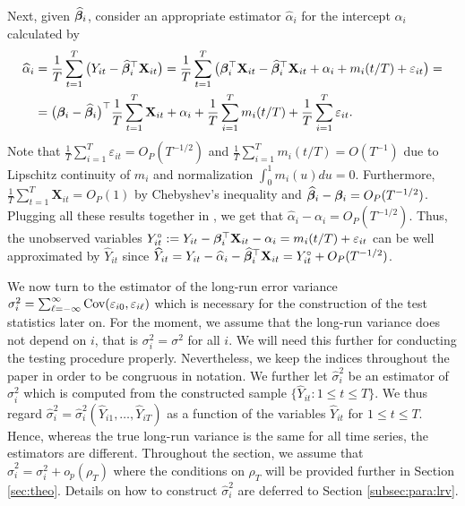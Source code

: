 \documentclass[a4paper,12pt]{article}
\makeatletter
\renewcommand{\eqref}[1]{\tagform@{\ref{#1}}}
\makeatother
\begin{document}
Next, given $\widehat{\bm{\beta}}_i$, consider an appropriate estimator $\widehat{\alpha}_{i}$ for the intercept $\alpha_i$ calculated by
\begin{align}\label{alpha-est}
\widehat{\alpha}_i &= \frac{1}{T}\sum_{t=1}^T \big(Y_{it} - \widehat{\bm{\beta}}_i^\top \mathbf{X}_{it}\big) = \frac{1}{T}\sum_{t=1}^T \big(\bm{\beta}_i^\top \mathbf{X}_{it} - \widehat{\bm{\beta}}_i^\top \mathbf{X}_{it} + \alpha_i + m_i(t/T) + \varepsilon_{it}\big) =\\
&= \big(\bm{\beta}_i - \widehat{\bm{\beta}}_i \big)^\top\frac{1}{T}\sum_{t=1}^T  \mathbf{X}_{it} + \alpha_i + \frac{1}{T}\sum_{i=1}^T m_i(t/T) + \frac{1}{T}\sum_{i=1}^T \varepsilon_{it}.\nonumber
\end{align}
Note that $\frac{1}{T}\sum_{i=1}^T \varepsilon_{it} = O_P(T^{-1/2})$ and $\frac{1}{T}\sum_{i=1}^T m_i(t/T) = O(T^{-1})$ due to Lipschitz continuity of $m_i$ and normalization $\int_{0}^1 m_i(u)du = 0$. Furthermore, $\frac{1}{T}\sum_{t=1}^T  \mathbf{X}_{it} = O_P(1)$ by Chebyshev's inequality and $\widehat{\bm{\beta}}_i - \bm{\beta}_i = O_P (T^{-1/2})$. Plugging all these results together in \eqref{alpha-est}, we get that $\widehat{\alpha}_i - \alpha_i = O_P(T^{-1/2})$. Thus, the unobserved variables \linebreak $Y_{it}^\circ := Y_{it} - \bm{\beta}_i^\top \mathbf{X}_{it} - \alpha_i = m_i(t/T) + \varepsilon_{it}$ can be well approximated by $\widehat{Y}_{it} $ since \linebreak $\widehat{Y}_{it} = Y_{it} -\widehat{\alpha}_i - \widehat{\bm{\beta}}_i^\top \mathbf{X}_{it} = Y_{it}^\circ + O_P(T^{-1/2})$.

We now turn to the estimator of the long-run error variance $\sigma_i^2 = \sum\nolimits_{\ell=-\infty}^{\infty} \textnormal{Cov}(\varepsilon_{i0}, \varepsilon_{i\ell})$ which is necessary for the construction of the test statistics later on. For the moment, we assume that the long-run variance does not depend on $i$, that is $\sigma_i^2 = \sigma^2$ for all $i$. We will need this further for conducting the testing procedure properly. Nevertheless, we keep the indices throughout the paper in order to be congruous in notation. We further let $\widehat{\sigma}_i^2$ be an estimator of $\sigma_i^2$ which is computed from the constructed sample $\{ \widehat{Y}_{it}: 1 \le t \le T \}$. We thus regard $\widehat{\sigma}_i^2 = \widehat{\sigma}_i^2(\widehat{Y}_{i1},\ldots,\widehat{Y}_{iT})$ as a function of the variables $\widehat{Y}_{it}$ for $1 \le t \le T$. Hence, whereas the true long-run variance is the same for all time series, the estimators are different. Throughout the section, we assume that $\widehat{\sigma}_i^2 = \sigma_i^2 + o_p(\rho_T)$ where the conditions on $\rho_T$ will be provided further in Section \ref{sec:theo}. Details on how to construct $\widehat{\sigma}_i^2$ are deferred to Section \ref{subsec:para:lrv}. 
\end{document}
